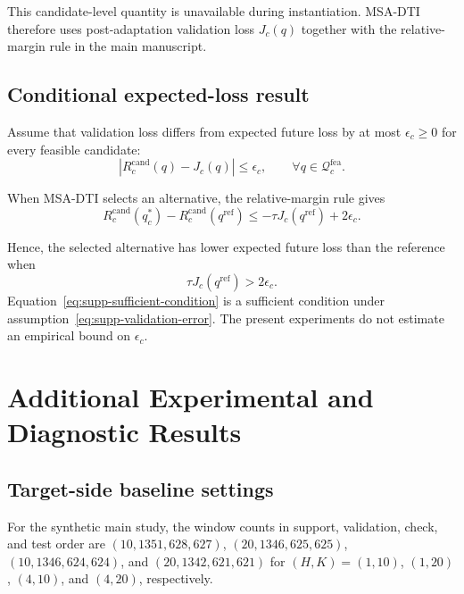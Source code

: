 \documentclass[11pt,a4paper]{article}
\begin{document}
This candidate-level quantity is unavailable during instantiation. MSA-DTI
therefore uses post-adaptation validation loss $J_c(q)$ together with the
relative-margin rule in the main manuscript.

\subsection{Conditional expected-loss result}

Assume that validation loss differs from expected future loss by at most
$\epsilon_c\geq0$ for every feasible candidate:
\begin{equation}
\left|
R_c^{\mathrm{cand}}(q)-J_c(q)
\right|
\leq
\epsilon_c,
\qquad
\forall q\in\mathcal{Q}_{c}^{\mathrm{fea}}.
\label{eq:supp-validation-error}
\end{equation}

When MSA-DTI selects an alternative, the relative-margin rule gives
\begin{equation}
R_c^{\mathrm{cand}}(q_c^{*})
-
R_c^{\mathrm{cand}}(q^{\mathrm{ref}})
\leq
-\tau J_c(q^{\mathrm{ref}})
+
2\epsilon_c.
\label{eq:supp-expected-loss}
\end{equation}

Hence, the selected alternative has lower expected future loss than the
reference when
\begin{equation}
\tau J_c(q^{\mathrm{ref}})>2\epsilon_c.
\label{eq:supp-sufficient-condition}
\end{equation}
Equation~\eqref{eq:supp-sufficient-condition} is a sufficient condition under
assumption~\eqref{eq:supp-validation-error}. The present experiments do not
estimate an empirical bound on $\epsilon_c$.

\section{Additional Experimental and Diagnostic Results}
\label{supp:diagnostics}



\subsection{Target-side baseline settings}

For the synthetic main study, the window counts in support, validation,
check, and test order are $(10,1351,628,627)$, $(20,1346,625,625)$,
$(10,1346,624,624)$, and $(20,1342,621,621)$ for $(H,K)=(1,10)$,
$(1,20)$, $(4,10)$, and $(4,20)$, respectively.
\end{document}
